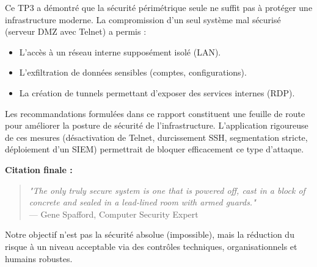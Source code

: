\documentclass[12pt,a4paper,openany]{report}
\begin{document}
	Ce TP3 a démontré que la sécurité périmétrique seule ne suffit pas à protéger une infrastructure moderne. La compromission d'un seul système mal sécurisé (serveur DMZ avec Telnet) a permis :
	\begin{itemize}
		\item L'accès à un réseau interne supposément isolé (LAN).
		\item L'exfiltration de données sensibles (comptes, configurations).
		\item La création de tunnels permettant d'exposer des services internes (RDP).
	\end{itemize}
	
	Les recommandations formulées dans ce rapport constituent une feuille de route pour améliorer la posture de sécurité de l'infrastructure. L'application rigoureuse de ces mesures (désactivation de Telnet, durcissement SSH, segmentation stricte, déploiement d'un SIEM) permettrait de bloquer efficacement ce type d'attaque.
	
	\textbf{Citation finale :}
	\begin{quote}
		\textit{"The only truly secure system is one that is powered off, cast in a block of concrete and sealed in a lead-lined room with armed guards."}\\
		--- Gene Spafford, Computer Security Expert
	\end{quote}
	
	Notre objectif n'est pas la sécurité absolue (impossible), mais la réduction du risque à un niveau acceptable via des contrôles techniques, organisationnels et humains robustes.
	
\end{document}
